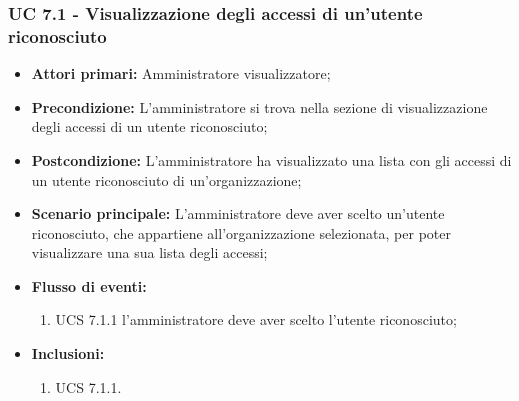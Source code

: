 \subsubsection{UC 7.1 - Visualizzazione degli accessi di un'utente riconosciuto}%
\begin{itemize}
\item \textbf{Attori primari:} Amministratore visualizzatore;
\item \textbf{Precondizione:} L'amministratore si trova nella sezione di visualizzazione degli accessi di un utente riconosciuto;
\item \textbf{Postcondizione:} L'amministratore ha visualizzato una lista con gli accessi di un utente riconosciuto di un'organizzazione;
\item \textbf{Scenario principale:} L'amministratore deve aver scelto un'utente riconosciuto, che appartiene all'organizzazione selezionata, per poter visualizzare una sua lista degli accessi;
\item \textbf{Flusso di eventi:} 
	\begin{enumerate}
		\item UCS 7.1.1 l'amministratore deve aver scelto l'utente riconosciuto;
	\end{enumerate}
\item \textbf{Inclusioni:}
\begin{enumerate}
	\item UCS 7.1.1.
\end{enumerate}
\end{itemize}

